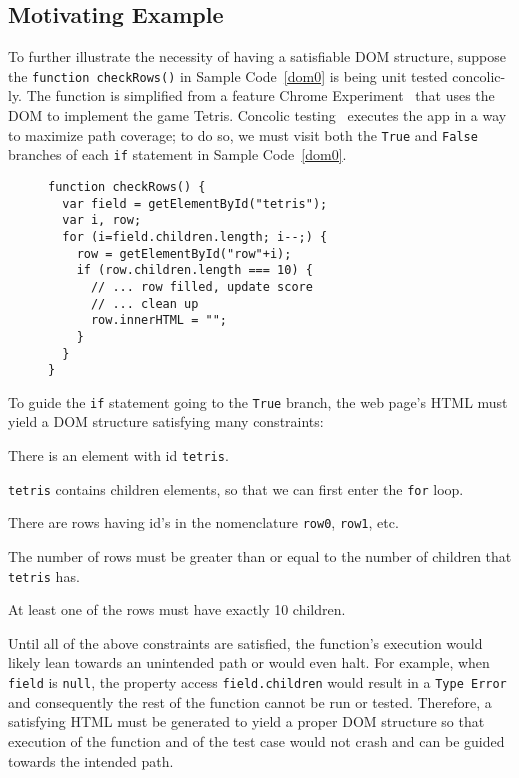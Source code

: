 \subsection{Motivating Example}
To further illustrate the necessity of having a satisfiable DOM structure, suppose the {\tt function checkRows()} in Sample Code~\ref{dom0} is being unit tested concolic-ly.  
The function is simplified from a feature Chrome Experiment~\cite{domtris} that uses the DOM to implement the game Tetris.  
Concolic testing~\cite{cute} executes the app in a way to maximize path coverage; to do so, we must visit both the {\tt True} and {\tt False} branches of each {\tt if} statement in Sample Code~\ref{dom0}.  
\begin{figure}
\begin{lstlisting}[caption=Example code whose tests and execution depend on the Document Object Model having a precise tree structure. {\tt getElementById()} is equivalent to {\tt document.getElementById()}.,label=dom0]
function checkRows() {
  var field = getElementById("tetris"); 
  var i, row;
  for (i=field.children.length; i--;) {
    row = getElementById("row"+i);
    if (row.children.length === 10) {
      // ... row filled, update score
      // ... clean up
	  row.innerHTML = "";
    }
  }
}
\end{lstlisting}
\end{figure}

To guide the {\tt if} statement going to the {\tt True} branch, the web page's HTML must yield a DOM structure satisfying many constraints:
\begin {compactitem}
\item There is an element with id {\tt tetris}.
\item {\tt tetris} contains children elements, so that we can first enter the {\tt for} loop.
\item There are rows having id's in the nomenclature {\tt row0}, {\tt row1}, etc.
\item The number of rows must be greater than or equal to the number of children that {\tt tetris} has.
\item At least one of the rows must have exactly 10 children.
\end {compactitem}

Until all of the above constraints are satisfied, the function's execution would likely lean towards an unintended path or would even halt.   
For example, when {\tt field} is {\tt null}, the property access {\tt field.children} would result in a {\tt Type Error} and consequently the rest of the function cannot be run or tested.  
Therefore, a satisfying HTML must be generated to yield a proper DOM structure so that execution of the function and of the test case would not crash and can be guided towards the intended path.  

